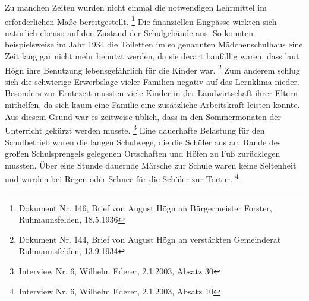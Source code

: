 \documentclass[a4paper]{article}
\begin{document}
Zu manchen Zeiten wurden nicht einmal die notwendigen Lehrmittel im
erforderlichen Maße bereitgestellt. \footnote{Dokument Nr. 146, Brief
von August Högn an Bürgermeister Forster, Ruhmannsfelden, 18.5.1936}
Die finanziellen Engpässe wirkten sich natürlich ebenso auf den Zustand
der Schulgebäude aus. So konnten beispielsweise im Jahr 1934 die
Toiletten im so genannten Mädchenschulhaus eine Zeit lang gar nicht
mehr benutzt werden, da sie derart baufällig waren, dass laut Högn ihre
Benutzung lebensgefährlich für die Kinder war. \footnote{Dokument Nr.
144, Brief von August Högn an verstärkten Gemeinderat Ruhmannsfelden,
13.9.1934} Zum anderem schlug sich die schwierige Erwerbslage vieler
Familien negativ auf das Lernklima nieder. Besonders zur Erntezeit
mussten viele Kinder in der Landwirtschaft ihrer Eltern mithelfen, da
sich kaum eine Familie eine zusätzliche Arbeitskraft leisten konnte.
Aus diesem Grund war es zeitweise üblich, dass in den Sommermonaten der
Unterricht gekürzt werden musste. \footnote{Interview Nr. 6, Wilhelm
Ederer, 2.1.2003, Absatz 30} Eine dauerhafte Belastung für den
Schulbetrieb waren die langen Schulwege, die die Schüler aus am Rande
des großen Schulsprengels gelegenen Ortschaften und Höfen zu Fuß
zurücklegen mussten. Über eine Stunde dauernde Märsche zur Schule waren
keine Seltenheit und wurden bei Regen oder Schnee für die Schüler zur
Tortur. \footnote{Interview Nr. 6, Wilhelm Ederer, 2.1.2003, Absatz 10}
\end{document}
